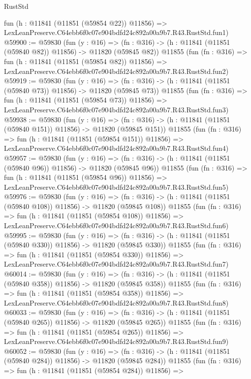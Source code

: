 \begin{lexlean}{RustStd}
\begin{coremodule}
    fun (h : @11841 (@11851 (@59854 @22)) @11856) =>
    LexLeanPreserve.C64ebb6f0c07e904bdfd24c892a00a9b7.R43.RustStd.fun1)
@59900 := @59830
    (fun (y : @16) =>
    (fn : @316) -> (h : @11841 (@11851 (@59840 @82)) @11856) -> @11820 (@59845 @82))
    @11855
    (fun (fn : @316) =>
    fun (h : @11841 (@11851 (@59854 @82)) @11856) =>
    LexLeanPreserve.C64ebb6f0c07e904bdfd24c892a00a9b7.R43.RustStd.fun2)
@59919 := @59830
    (fun (y : @16) =>
    (fn : @316) -> (h : @11841 (@11851 (@59840 @73)) @11856) -> @11820 (@59845 @73))
    @11855
    (fun (fn : @316) =>
    fun (h : @11841 (@11851 (@59854 @73)) @11856) =>
    LexLeanPreserve.C64ebb6f0c07e904bdfd24c892a00a9b7.R43.RustStd.fun3)
@59938 := @59830
    (fun (y : @16) =>
    (fn : @316) -> (h : @11841 (@11851 (@59840 @151)) @11856) -> @11820 (@59845 @151))
    @11855
    (fun (fn : @316) =>
    fun (h : @11841 (@11851 (@59854 @151)) @11856) =>
    LexLeanPreserve.C64ebb6f0c07e904bdfd24c892a00a9b7.R43.RustStd.fun4)
@59957 := @59830
    (fun (y : @16) =>
    (fn : @316) -> (h : @11841 (@11851 (@59840 @96)) @11856) -> @11820 (@59845 @96))
    @11855
    (fun (fn : @316) =>
    fun (h : @11841 (@11851 (@59854 @96)) @11856) =>
    LexLeanPreserve.C64ebb6f0c07e904bdfd24c892a00a9b7.R43.RustStd.fun5)
@59976 := @59830
    (fun (y : @16) =>
    (fn : @316) -> (h : @11841 (@11851 (@59840 @108)) @11856) -> @11820 (@59845 @108))
    @11855
    (fun (fn : @316) =>
    fun (h : @11841 (@11851 (@59854 @108)) @11856) =>
    LexLeanPreserve.C64ebb6f0c07e904bdfd24c892a00a9b7.R43.RustStd.fun6)
@59995 := @59830
    (fun (y : @16) =>
    (fn : @316) -> (h : @11841 (@11851 (@59840 @330)) @11856) -> @11820 (@59845 @330))
    @11855
    (fun (fn : @316) =>
    fun (h : @11841 (@11851 (@59854 @330)) @11856) =>
    LexLeanPreserve.C64ebb6f0c07e904bdfd24c892a00a9b7.R43.RustStd.fun7)
@60014 := @59830
    (fun (y : @16) =>
    (fn : @316) -> (h : @11841 (@11851 (@59840 @358)) @11856) -> @11820 (@59845 @358))
    @11855
    (fun (fn : @316) =>
    fun (h : @11841 (@11851 (@59854 @358)) @11856) =>
    LexLeanPreserve.C64ebb6f0c07e904bdfd24c892a00a9b7.R43.RustStd.fun8)
@60033 := @59830
    (fun (y : @16) =>
    (fn : @316) -> (h : @11841 (@11851 (@59840 @265)) @11856) -> @11820 (@59845 @265))
    @11855
    (fun (fn : @316) =>
    fun (h : @11841 (@11851 (@59854 @265)) @11856) =>
    LexLeanPreserve.C64ebb6f0c07e904bdfd24c892a00a9b7.R43.RustStd.fun9)
@60052 := @59830
    (fun (y : @16) =>
    (fn : @316) -> (h : @11841 (@11851 (@59840 @284)) @11856) -> @11820 (@59845 @284))
    @11855
    (fun (fn : @316) =>
    fun (h : @11841 (@11851 (@59854 @284)) @11856) =>

\end{coremodule}
\end{lexlean}
